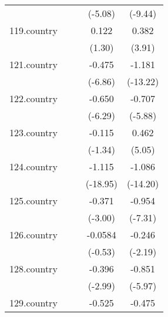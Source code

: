 {\begin{tabular}{l*{4}{c}}
            &                     &                     &     (-5.08)         &     (-9.44)         \\
[1em]
119.country &                     &                     &       0.122         &       0.382\sym{***}\\
            &                     &                     &      (1.30)         &      (3.91)         \\
[1em]
121.country &                     &                     &      -0.475\sym{***}&      -1.181\sym{***}\\
            &                     &                     &     (-6.86)         &    (-13.22)         \\
[1em]
122.country &                     &                     &      -0.650\sym{***}&      -0.707\sym{***}\\
            &                     &                     &     (-6.29)         &     (-5.88)         \\
[1em]
123.country &                     &                     &      -0.115         &       0.462\sym{***}\\
            &                     &                     &     (-1.34)         &      (5.05)         \\
[1em]
124.country &                     &                     &      -1.115\sym{***}&      -1.086\sym{***}\\
            &                     &                     &    (-18.95)         &    (-14.20)         \\
[1em]
125.country &                     &                     &      -0.371\sym{**} &      -0.954\sym{***}\\
            &                     &                     &     (-3.00)         &     (-7.31)         \\
[1em]
126.country &                     &                     &     -0.0584         &      -0.246\sym{*}  \\
            &                     &                     &     (-0.53)         &     (-2.19)         \\
[1em]
128.country &                     &                     &      -0.396\sym{**} &      -0.851\sym{***}\\
            &                     &                     &     (-2.99)         &     (-5.97)         \\
[1em]
129.country &                     &                     &      -0.525\sym{***}&      -0.475\sym{***}\\

\end{tabular}}
